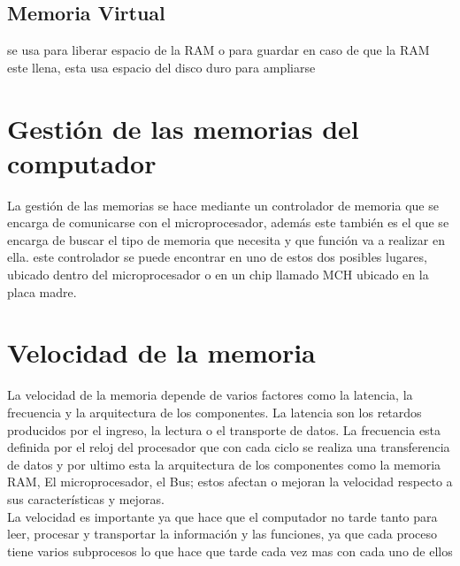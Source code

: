 \documentclass{article}
\begin{document}
	\subsection{Memoria Virtual}
	se usa para liberar espacio de la RAM o para guardar en caso de que la RAM este llena, esta usa espacio del disco duro para ampliarse
	
	\section{Gestión de las memorias del computador}\label{contenido}
	La gestión de las memorias se hace mediante un controlador de memoria que se encarga de comunicarse con el microprocesador, además este también es el que se encarga de buscar el tipo de memoria que necesita y que función va a realizar en ella.
	este controlador se puede encontrar en uno de estos dos posibles lugares, ubicado dentro del microprocesador o en un chip llamado MCH ubicado en la placa madre.\cite{memoria}
	
	\section{Velocidad de la memoria}\label{contenido}
	La velocidad de la memoria depende de varios factores como la latencia, la frecuencia y la arquitectura de los componentes.
	La latencia son los retardos producidos por el ingreso,
	la lectura o el transporte de datos. La frecuencia esta definida por el reloj del procesador que con cada ciclo se realiza una transferencia de datos y por ultimo esta la arquitectura de los componentes como la memoria RAM,
	El microprocesador, el Bus; estos afectan o mejoran la velocidad respecto a sus características y mejoras.\cite{velocidad}\\
	
	La velocidad es importante ya que hace que el computador no tarde tanto para leer, procesar y transportar la información y las funciones, ya que cada proceso tiene varios subprocesos lo que hace que tarde cada vez mas con cada uno de ellos
	\vfill
	\newpage
	
	
	
	
	
	
\end{document}
